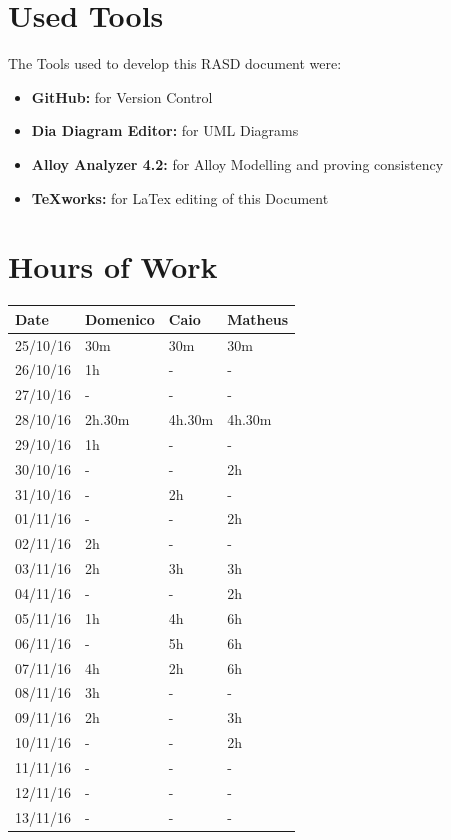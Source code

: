 \documentclass[a4paper]{article}
\begin{document}
\section{Used Tools}
The Tools used to develop this RASD document were:
\begin{itemize}
	\item \textbf{GitHub:} for Version Control
	\item \textbf {Dia Diagram Editor:} for UML Diagrams
	\item \textbf{Alloy Analyzer 4.2:} for Alloy Modelling and proving consistency 
	\item \textbf {TeXworks:} for LaTex editing of this Document
\end{itemize}
\newpage

\section{Hours of Work}
\begin{tabular}{ | l | l | l | l | }
\hline
	\textbf {Date} & \textbf {Domenico} & \textbf {Caio} & \textbf {Matheus} \\ \hline
	25/10/16& 30m & 30m & 30m \\ \hline
	26/10/16& 1h & -  & -  \\ \hline
	27/10/16&  - & - & -  \\ \hline
	28/10/16& 2h.30m & 4h.30m & 4h.30m \\ \hline
	29/10/16& 1h & -  & - \\ \hline
	30/10/16&  - & - & 2h\\ \hline
	31/10/16&  - & 2h & - \\ \hline
	01/11/16&  - & - & 2h \\ \hline
	02/11/16&  2h & - & - \\ \hline
	03/11/16&  2h & 3h & 3h \\ \hline
	04/11/16&  - & - & 2h\\ \hline
	05/11/16&  1h & 4h &  6h\\ \hline
	06/11/16&  - & 5h & 6h\\ \hline
	07/11/16& 4h & 2h & 6h \\ \hline
	08/11/16&  3h & - & - \\ \hline
	09/11/16&  2h & - & 3h \\ \hline
	10/11/16&  - & - & 2h\\ \hline
	11/11/16&  - & - & - \\ \hline
	12/11/16&  - & - & - \\ \hline
	13/11/16&  - & - & - \\ \hline
\end{tabular}

\newpage
\end{document}
